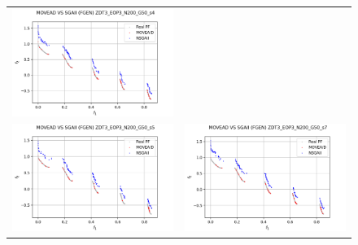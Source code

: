 \begin{figure}[H]
\begin{tabular}{c c}
    \includegraphics[scale=0.5]{figures/ZDT3_EOP3_N200_G50_T30/s4_comp.png}\\
    \includegraphics[scale=0.5]{figures/ZDT3_EOP3_N200_G50_T30/s5_comp.png} &
    \includegraphics[scale=0.5]{figures/ZDT3_EOP3_N200_G50_T30/s7_comp.png}\\

\end{tabular}
\end{figure}
